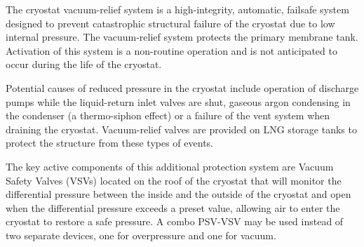 The cryostat vacuum-relief system is a high-integrity, automatic, failsafe system designed to prevent catastrophic structural failure of the cryostat due to low internal pressure. The vacuum-relief system protects the primary membrane tank. Activation of this system is a non-routine operation and is not anticipated to occur during the life of the cryostat.

Potential causes of reduced pressure in the cryostat include operation of discharge pumps while the liquid-return inlet valves are shut, gaseous argon condensing in the condenser (a thermo-siphon effect) or a failure of the vent system when draining the cryostat. Vacuum-relief valves are provided on LNG storage tanks to protect the structure from these types of events.

The key active components of this additional protection system are Vacuum Safety Valves (VSVs) located on the roof of the cryostat that will monitor the differential pressure between the inside and the outside of the cryostat and open when the differential pressure exceeds a preset value, allowing air to enter the cryostat to restore a safe pressure. A combo PSV-VSV may be used instead of two separate devices, one for overpressure and one for vacuum.
